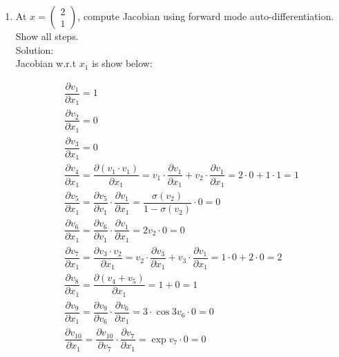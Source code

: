 \documentclass[12pt]{article}
\begin{document}
\begin{enumerate}[label=(\roman*)]
\item At 
$x=
\begin{pmatrix}
2\\1
\end{pmatrix}$,
compute Jacobian using forward mode auto-differentiation. Show all steps.\\
Solution:\\
Jacobian w.r.t $x_1$ is show below:\\

\begin{fleqn}
    \begin{gather*}
        \dfrac{\partial v_{1}}{\partial x_{1}} =  1 \\
        \dfrac{\partial v_{2}}{\partial x_{1}} =  0  \\
        \dfrac{\partial v_{3}}{\partial x_{1}} = 0  \\
        \dfrac{\partial v_{4}}{\partial x_{1}} = \dfrac{\partial (v_{1}\cdot v_1)}{\partial x_{1}} = v_1\cdot\dfrac{\partial v_{1}}{\partial x_{1}} + v_2\cdot\dfrac{\partial v_{1}}{\partial x_{1}} = 2\cdot 0 + 1\cdot 1 = 1   \\
        \dfrac{\partial v_{5}}{\partial x_{1}} = \dfrac{\partial v_{5}}{\partial v_{1}}\cdot \dfrac{\partial v_{1}}{\partial x_{1}} =  \dfrac{\sigma(v_2)}{1-\sigma(v_2)} \cdot 0 = 0  \\ 
        \dfrac{\partial v_{6}}{\partial x_{1}} = \dfrac{\partial v_{6}}{\partial v_{1}} \cdot \dfrac{\partial v_{1}}{\partial x_{1}} = 2 v_2 \cdot 0 = 0 \\
        \dfrac{\partial v_{7}}{\partial x_{1}} = \dfrac{\partial v_{3}\cdot v_2}{\partial x_{1}} = v_2 \cdot \dfrac{\partial v_{3}}{\partial x_{1}} + v_3 \cdot \dfrac{\partial v_{1}}{\partial x_{1}} = 1 \cdot 0 + 2 \cdot 0 = 2 \\ 
        \dfrac{\partial v_{8}}{\partial x_{1}} = \dfrac{\partial (v_{4} + v_5)}{\partial x_{1}} = 1 + 0 = 1  \\
        \dfrac{\partial v_{9}}{\partial x_{1}} = \dfrac{\partial v_{9}}{\partial v_{6}} \cdot \dfrac{\partial v_{6}}{\partial x_{1}} = 3 \cdot \cos{3v_6} \cdot 0 =  0  \\
        \dfrac{\partial v_{10}}{\partial x_{1}} = \dfrac{\partial v_{10}}{\partial v_{7}} \cdot \dfrac{\partial v_{7}}{\partial x_{1}}  = \exp{v_7} \cdot 0 = 0  \\

\end{gather*}
\end{fleqn}
\end{enumerate}
\end{document}
